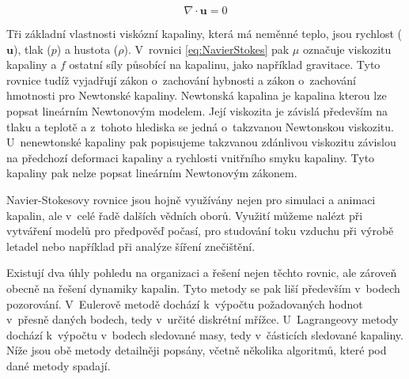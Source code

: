 \begin{equation}
	\nabla \cdot \mathbf{u} = 0
	\label{eq:NavierStokes2}
\end{equation}

Tři základní vlastnosti viskózní kapaliny, která má neměnné teplo, jsou rychlost ($\mathbf{u}$), tlak ($p$) a hustota ($\rho$). V~rovnici \ref{eq:NavierStokes} pak $\mu$ označuje viskozitu kapaliny a $f$ ostatní síly působící na kapalinu, jako například gravitace. Tyto rovnice tudíž vyjadřují zákon o~zachování hybnosti a zákon o~zachování hmotnosti pro Newtonské kapaliny. Newtonská kapalina je kapalina kterou lze popsat lineárním Newtonovým modelem. Její viskozita je závislá především na tlaku a teplotě a z~tohoto hlediska se jedná o~takzvanou Newtonskou viskozitu. U~nenewtonské kapaliny pak popisujeme takzvanou zdánlivou viskozitu závislou na předchozí deformaci kapaliny a rychlosti vnitřního smyku kapaliny. Tyto kapaliny pak nelze popsat lineárním Newtonovým zákonem.\cite{StejskalJan2013Pmks}

Navier-Stokesovy rovnice jsou hojně využívány nejen pro simulaci a animaci kapalin, ale v~celé řadě dalších vědních oborů. Využití můžeme nalézt při vytváření modelů pro předpověď počasí, pro studování toku vzduchu při výrobě letadel nebo například při analýze šíření znečištění.
\break

Existují dva úhly pohledu na organizaci a řešení nejen těchto rovnic, ale zároveň obecně na řešení dynamiky kapalin. Tyto metody se pak liší především v~bodech pozorování. V~Eulerově metodě dochází k~výpočtu požadovaných hodnot v~přesně daných bodech, tedy v~určité diskrétní mřížce. U~Lagrangeovy metody dochází k~výpočtu v~bodech sledované masy, tedy v~částicích sledované kapaliny. Níže jsou obě metody detailněji popsány, včetně několika algoritmů, které pod dané metody spadají.

